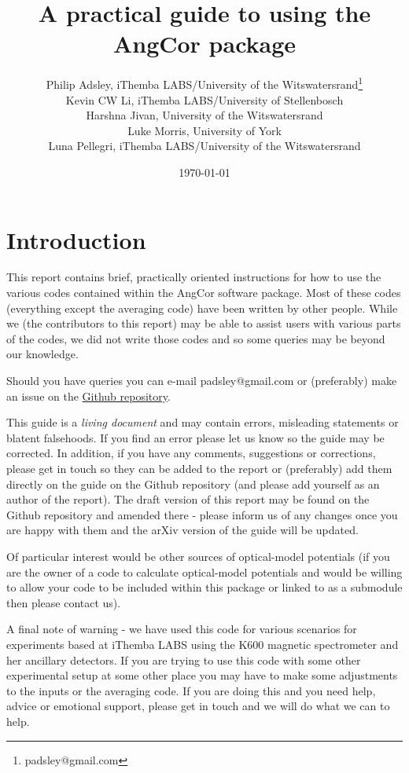 \documentclass[a4paper,10pt]{article}
\title{A practical guide to using the AngCor package}
\author{Philip Adsley, iThemba LABS/University of the Witswatersrand\footnote{padsley@gmail.com}\\
Kevin CW Li, iThemba LABS/University of Stellenbosch\\
Harshna Jivan, University of the Witswatersrand\\
Luke Morris, University of York\\
Luna Pellegri, iThemba LABS/University of the Witswatersrand}
\date{\today}
\begin{document}
\lstset{language=bash}
\maketitle

\section{Introduction}

This report contains brief, practically oriented instructions for how to use the various codes contained within the AngCor software package. Most of these codes (everything except the averaging code) have been written by other people. While we (the contributors to this report) may be able to assist users with various parts of the codes, we did not write those codes and so some queries may be beyond our knowledge.

Should you have queries you can e-mail padsley@gmail.com or (preferably) make an issue on the \href{https://github.com/padsley/AngCorPackage}{Github repository}.

This guide is a {\it living document} and may contain errors, misleading statements or blatent falsehoods. If you find an error please let us know so the guide may be corrected. In addition, if you have any comments, suggestions or corrections, please get in touch so they can be added to the report or (preferably) add them directly on the guide on the Github repository (and please add yourself as an author of the report). The draft version of this report may be found on the Github repository and amended there - please inform us of any changes once you are happy with them and the arXiv version of the guide will be updated.

Of particular interest would be other sources of optical-model potentials (if you are the owner of a code to calculate optical-model potentials and would be willing to allow your code to be included within this package or linked to as a submodule then please contact us).

A final note of warning - we have used this code for various scenarios for experiments based at iThemba LABS using the K600 magnetic spectrometer and her ancillary detectors. If you are trying to use this code with some other experimental setup at some other place you may have to make some adjustments to the inputs or the averaging code. If you are doing this and you need help, advice or emotional support, please get in touch and we will do what we can to help.
\end{document}

